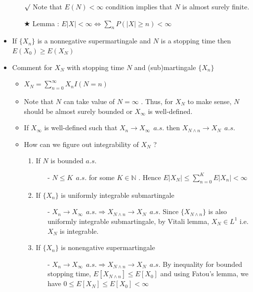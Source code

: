 \documentclass[12pt, A4]{article}
\newcommand{\rmk}{$\surd$}
\newcommand{\trick}{$\bigstar$}
\newcommand{\N}{\mathbb{N}}
\begin{document}
\begin{itemize}
\begin{itemize}
		\item[\rmk] Note that $E(N)<\infty$ condition implies that $N$ is almost surely finite.
		\item[\trick] Lemma : $E|X|<\infty \Leftrightarrow \sum_n P(|X|\geq n)<\infty$ 
	\end{itemize}
	\item If $\{X_n\}$ is a nonnegative supermartingale and $N$ is a stopping time then $E(X_0)\geq E(X_N)$
	\item Comment for $X_N$ with stopping time $N$ and (sub)martingale $\{X_n\}$
	\begin{itemize}
		\item $X_N=\sum_{n=0}^\infty X_nI(N=n)$
		\item Note that $N$ can take value of $N=\infty$ . Thus, for $X_N$ to make sense, $N$ should be almost surely bounded or $X_\infty$ is well-defined. 
		\item If $X_\infty$ is well-defined such that $X_n\rightarrow X_\infty\;\,a.s.$ then $X_{N\wedge n}\rightarrow X_N\;\,a.s.$
		\item How can we figure out integrability of $X_N$ ?
		\begin{enumerate}
			\item If $N$ is bounded $a.s.$
			\begin{itemize}
				\item[-] $N\leq K\;\,a.s.$ for some $K\in \N$ . Hence $E|X_N|\leq \sum_{n=0}^K E|X_n|<\infty$
			\end{itemize}
			\item If $\{X_n\}$ is uniformly integrable submartingale
			\begin{itemize}
				\item[-] $X_n\rightarrow X_\infty\;\,a.s.\Rightarrow X_{N\wedge n}\rightarrow X_N\;\,a.s.$ \;Since $\{X_{N\wedge n}\}$ is also uniformly integrable submartingale, by Vitali lemma, $X_N\in L^1$ i.e. $X_N$ is integrable. 
			\end{itemize}
			\item If $\{X_n\}$ is nonengative supermartingale
			\begin{itemize}
				\item[-] $X_n\rightarrow X_\infty\;\,a.s.\Rightarrow X_{N\wedge n}\rightarrow X_N\;\,a.s.$ By inequality for bounded stopping time, $E[X_{N\wedge n}]\leq E[X_0]$ and using Fatou's lemma, we have $0\leq E[X_N]\leq E[X_0]<\infty$
			\end{itemize}
		\end{enumerate}
	\end{itemize}
\end{itemize}
\end{document}
